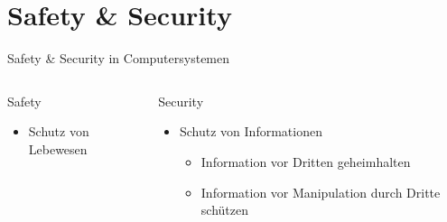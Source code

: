 \section{Safety \& Security}

\begin{frame}[T]{Safety \& Security in Computersystemen}
\small
  \begin{columns}[t,fullwidth]
   \hfill
    \begin{column}{.45\linewidth}
      \begin{block}{Safety}
      \begin{itemize}
        \item Schutz von Lebewesen

      \end{itemize}
      \end{block}
    \end{column}
    \hfill
    \begin{column}{.45\linewidth}
      \begin{block}{Security}
      \begin{itemize}
        \item Schutz von Informationen
        \begin{itemize}
          \item Information vor Dritten geheimhalten
          \item Information vor Manipulation durch Dritte schützen
        \end{itemize}
      \end{itemize}
      \end{block}
    \end{column}
    \hfill
  \end{columns}
\end{frame}

